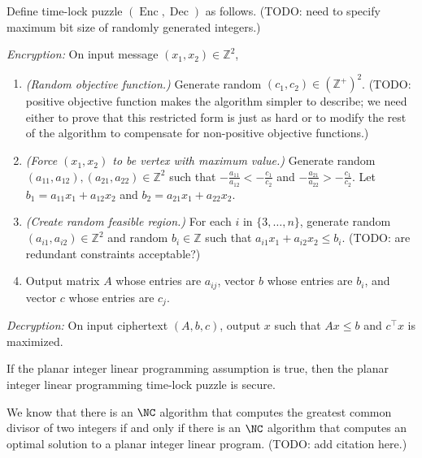 \documentclass{article}
\newcommand{\Enc}{\operatorname{Enc}}
\newcommand{\Dec}{\operatorname{Dec}}
\begin{document}
\begin{protocol}
  Define time-lock puzzle $(\Enc, \Dec)$ as follows.
  (TODO: need to specify maximum bit size of randomly generated integers.)

  \emph{Encryption:} On input message $(x_1, x_2) \in \mathbb{Z}^2$,
  \begin{enumerate}
  \item \emph{(Random objective function.)}
    Generate random $(c_1, c_2) \in \left(\mathbb{Z}^+\right)^2$.
    (TODO: positive objective function makes the algorithm simpler to describe; we need either to prove that this restricted form is just as hard or to modify the rest of the algorithm to compensate for non-positive objective functions.)
  \item \emph{(Force $(x_1, x_2)$ to be vertex with maximum value.)}
    Generate random $(a_{11}, a_{12}), (a_{21}, a_{22}) \in \mathbb{Z}^2$ such that $-\frac{a_{11}}{a_{12}} < -\frac{c_1}{c_2}$ and $-\frac{a_{21}}{a_{22}} > -\frac{c_1}{c_2}$.
    Let $b_1 = a_{11} x_1 + a_{12} x_2$ and $b_2 = a_{21} x_1 + a_{22} x_2$.
  \item \emph{(Create random feasible region.)}
    For each $i$ in $\{3, \dotsc, n\}$, generate random $(a_{i1}, a_{i2}) \in \mathbb{Z}^2$ and random $b_i \in \mathbb{Z}$ such that $a_{i1} x_1 + a_{i2} x_2 \leq b_i$.
    (TODO: are redundant constraints acceptable?)
  \item Output matrix $A$ whose entries are $a_{ij}$, vector $b$ whose entries are $b_i$, and vector $c$ whose entries are $c_j$.
  \end{enumerate}

  \emph{Decryption:} On input ciphertext $(A, b, c)$, output $x$ such that $Ax \leq b$ and $c^\intercal x$ is maximized.
\end{protocol}

\begin{conjecture}
  If the planar integer linear programming assumption is true, then the planar integer linear programming time-lock puzzle is secure.
\end{conjecture}

We know that there is an $\NC$ algorithm that computes the greatest common divisor of two integers if and only if there is an $\NC$ algorithm that computes an optimal solution to a planar integer linear program.
(TODO: add citation here.)
\end{document}
